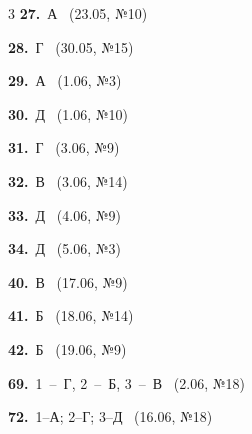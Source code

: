 \documentclass[12pt]{article}
\begin{document}
\ifshowsolutions
{}
\begin{multicols}{3}\noindent
\noindent\textbf{27.}~А \ {\scriptsize\color{gray}(23.05, №10)}\par
\noindent\textbf{28.}~Г \ {\scriptsize\color{gray}(30.05, №15)}\par
\noindent\textbf{29.}~А \ {\scriptsize\color{gray}(1.06, №3)}\par
\noindent\textbf{30.}~Д \ {\scriptsize\color{gray}(1.06, №10)}\par
\noindent\textbf{31.}~Г \ {\scriptsize\color{gray}(3.06, №9)}\par
\noindent\textbf{32.}~В \ {\scriptsize\color{gray}(3.06, №14)}\par
\noindent\textbf{33.}~Д \ {\scriptsize\color{gray}(4.06, №9)}\par
\noindent\textbf{34.}~Д \ {\scriptsize\color{gray}(5.06, №3)}\par
\noindent\textbf{40.}~В \ {\scriptsize\color{gray}(17.06, №9)}\par
\noindent\textbf{41.}~Б \ {\scriptsize\color{gray}(18.06, №14)}\par
\noindent\textbf{42.}~Б \ {\scriptsize\color{gray}(19.06, №9)}\par
\noindent\textbf{69.}~1~--~Г, 2~--~Б, 3~--~В \ {\scriptsize\color{gray}(2.06, №18)}\par
\noindent\textbf{72.}~1--А; 2--Г; 3--Д \ {\scriptsize\color{gray}(16.06, №18)}\par
\end{multicols}
\fi

\endgroup
\end{document}
